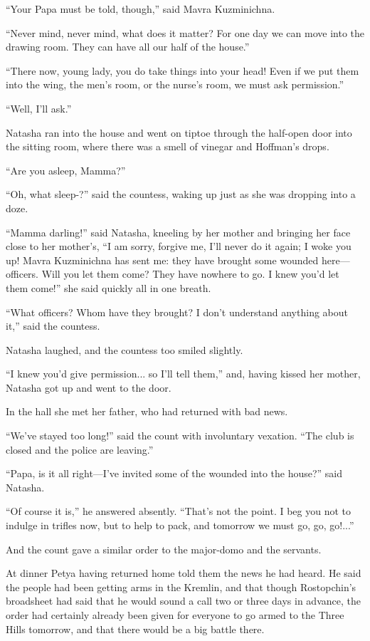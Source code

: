 ``Your Papa must be told, though,'' said Mavra Kuzminichna.

``Never mind, never mind, what does it matter? For one day we can
move into the drawing room. They can have all our half of the
house.''

``There now, young lady, you do take things into your head! Even
if we put them into the wing, the men's room, or the nurse's
room, we must ask permission.''

``Well, I'll ask.''

Natasha ran into the house and went on tiptoe through the
half-open door into the sitting room, where there was a smell of
vinegar and Hoffman's drops.

``Are you asleep, Mamma?''

``Oh, what sleep-?'' said the countess, waking up just as she was
dropping into a doze.

``Mamma darling!'' said Natasha, kneeling by her mother and
bringing her face close to her mother's, ``I am sorry, forgive
me, I'll never do it again; I woke you up! Mavra Kuzminichna has
sent me: they have brought some wounded here---officers. Will you
let them come? They have nowhere to go. I knew you'd let them
come!'' she said quickly all in one breath.

``What officers? Whom have they brought? I don't understand
anything about it,'' said the countess.

Natasha laughed, and the countess too smiled slightly.

``I knew you'd give permission... so I'll tell them,'' and,
having kissed her mother, Natasha got up and went to the door.

In the hall she met her father, who had returned with bad news.

``We've stayed too long!'' said the count with involuntary
vexation. ``The club is closed and the police are leaving.''

``Papa, is it all right---I've invited some of the wounded into
the house?'' said Natasha.

``Of course it is,'' he answered absently. ``That's not the
point. I beg you not to indulge in trifles now, but to help to
pack, and tomorrow we must go, go, go!...''

And the count gave a similar order to the major-domo and the
servants.

At dinner Petya having returned home told them the news he had
heard. He said the people had been getting arms in the Kremlin,
and that though Rostopchin's broadsheet had said that he would
sound a call two or three days in advance, the order had
certainly already been given for everyone to go armed to the
Three Hills tomorrow, and that there would be a big battle there.

